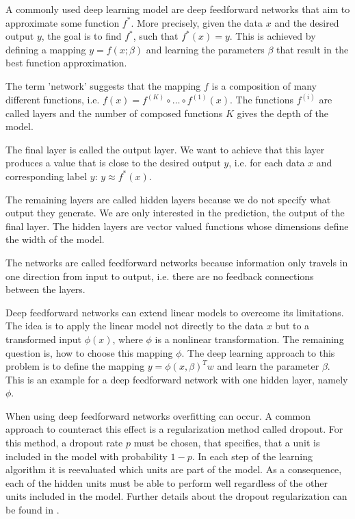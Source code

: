 \documentclass[12pt, a4paper]{article}
\theoremstyle{definition}
\theoremstyle{plain}
\numberwithin{equation}{section}
\numberwithin{figure}{section}
\numberwithin{table}{section}
\begin{document}
	
	A commonly used deep learning model are deep feedforward networks that aim to approximate some function $f^*$.
	More precisely, given the data $x$ and the desired output $y$, the goal is to find $f^*$, such that $f^*(x)=y$.
	This is achieved by defining a mapping $y = f(x; \beta)$ and learning the parameters $\beta$ that result in the best function approximation.
	
	The term 'network' suggests that the mapping $f$ is a composition of many different functions, i.e.
	$ f(x) = f^{(K)}\circ \dots \circ f^{(1)}(x)$.
	The functions $f^{(i)}$ are called layers and the number of composed functions $K$ gives the depth of the model.
	
	The final layer is called the output layer.
	We want to achieve that this layer produces a value that is close to the desired output $y$, i.e. for each data $x$ and corresponding label $y$: $y \approx f^*(x)$.
	
	The remaining layers are called hidden layers because we do not specify what output they generate.
	We are only interested in the prediction, the output of the final layer.
	The hidden layers are vector valued functions whose dimensions define the width of the model.
	
	The networks are called feedforward networks because information only travels in one direction from input to output, i.e. there are no feedback connections between the layers.
	
	Deep feedforward networks can extend linear models to overcome its limitations.
	The idea is to apply the linear model not directly to the data $x$ but to a transformed input $\phi(x)$, where $\phi$ is a nonlinear transformation.
	The remaining question is, how to choose this mapping $\phi$.
	The deep learning approach to this problem is to define the mapping $y = \phi(x, \beta)^Tw$ and learn the parameter $\beta$.
	This is an example for a deep feedforward network with one hidden layer, namely $\phi$.
	
	When using deep feedforward networks overfitting can occur.
	A common approach to counteract this effect is a regularization method called dropout.
	For this method, a dropout rate $p$ must be chosen, that specifies, that a unit is included in the model with probability $1-p$.
	In each step of the learning algorithm it is reevaluated which units are part of the model.
	As a consequence, each of the hidden units must be able to perform well regardless of the other units included in the model.
	Further details about the dropout regularization can be found in \citet*[chapter~7.12]{deeplbook}.
	
\end{document}

